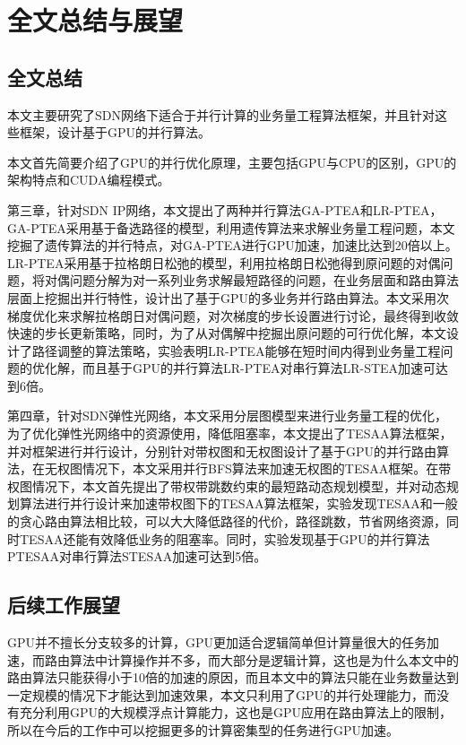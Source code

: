 \documentclass[master]{thesis-uestc}
\begin{document}
\chapter{全文总结与展望}
\section{全文总结}
本文主要研究了SDN网络下适合于并行计算的业务量工程算法框架，并且针对这些框架，设计基于GPU的并行算法。

本文首先简要介绍了GPU的并行优化原理，主要包括GPU与CPU的区别，GPU的架构特点和CUDA编程模式。

第三章，针对SDN IP网络，本文提出了两种并行算法GA-PTEA和LR-PTEA，GA-PTEA采用基于备选路径的模型，利用遗传算法来求解业务量工程问题，本文挖掘了遗传算法的并行特点，对GA-PTEA进行GPU加速，加速比达到20倍以上。LR-PTEA采用基于拉格朗日松弛的模型，利用拉格朗日松弛得到原问题的对偶问题，将对偶问题分解为对一系列业务求解最短路径的问题，在业务层面和路由算法层面上挖掘出并行特性，设计出了基于GPU的多业务并行路由算法。本文采用次梯度优化来求解拉格朗日对偶问题，对次梯度的步长设置进行讨论，最终得到收敛快速的步长更新策略，同时，为了从对偶解中挖掘出原问题的可行优化解，本文设计了路径调整的算法策略，实验表明LR-PTEA能够在短时间内得到业务量工程问题的优化解，而且基于GPU的并行算法LR-PTEA对串行算法LR-STEA加速可达到6倍。

第四章，针对SDN弹性光网络，本文采用分层图模型来进行业务量工程的优化，为了优化弹性光网络中的资源使用，降低阻塞率，本文提出了TESAA算法框架，并对框架进行并行设计，分别针对带权图和无权图设计了基于GPU的并行路由算法，在无权图情况下，本文采用并行BFS算法来加速无权图的TESAA框架。在带权图情况下，本文首先提出了带权带跳数约束的最短路动态规划模型，并对动态规划算法进行并行设计来加速带权图下的TESAA算法框架，实验发现TESAA和一般的贪心路由算法相比较，可以大大降低路径的代价，路径跳数，节省网络资源，同时TESAA还能有效降低业务的阻塞率。同时，实验发现基于GPU的并行算法PTESAA对串行算法STESAA加速可达到5倍。

\section{后续工作展望}
GPU并不擅长分支较多的计算，GPU更加适合逻辑简单但计算量很大的任务加速，而路由算法中计算操作并不多，而大部分是逻辑计算，这也是为什么本文中的路由算法只能获得小于10倍的加速的原因，而且本文中的算法只能在业务数量达到一定规模的情况下才能达到加速效果，本文只利用了GPU的并行处理能力，而没有充分利用GPU的大规模浮点计算能力，这也是GPU应用在路由算法上的限制，所以在今后的工作中可以挖掘更多的计算密集型的任务进行GPU加速。
\end{document}
